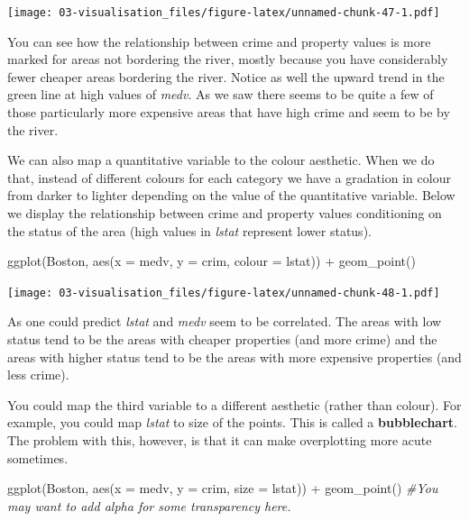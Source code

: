 \documentclass[
]{book}
\newenvironment{Shaded}{\begin{snugshade}}{\end{snugshade}}
\newcommand{\AttributeTok}[1]{\textcolor[rgb]{0.77,0.63,0.00}{#1}}
\newcommand{\CommentTok}[1]{\textcolor[rgb]{0.56,0.35,0.01}{\textit{#1}}}
\newcommand{\FunctionTok}[1]{\textcolor[rgb]{0.00,0.00,0.00}{#1}}
\newcommand{\NormalTok}[1]{#1}
\newcommand{\SpecialCharTok}[1]{\textcolor[rgb]{0.00,0.00,0.00}{#1}}
\begin{document}
\texttt{[image: 03-visualisation\_files/figure-latex/unnamed-chunk-47-1.pdf]}

You can see how the relationship between crime and property values is more marked for areas not bordering the river, mostly because you have considerably fewer cheaper areas bordering the river. Notice as well the upward trend in the green line at high values of \emph{medv}. As we saw there seems to be quite a few of those particularly more expensive areas that have high crime and seem to be by the river.

We can also map a quantitative variable to the colour aesthetic. When we do that, instead of different colours for each category we have a gradation in colour from darker to lighter depending on the value of the quantitative variable. Below we display the relationship between crime and property values conditioning on the status of the area (high values in \emph{lstat} represent lower status).

\begin{Shaded}
\begin{Highlighting}[]
\FunctionTok{ggplot}\NormalTok{(Boston, }\FunctionTok{aes}\NormalTok{(}\AttributeTok{x =}\NormalTok{ medv, }\AttributeTok{y =}\NormalTok{ crim, }\AttributeTok{colour =}\NormalTok{ lstat)) }\SpecialCharTok{+}
  \FunctionTok{geom\_point}\NormalTok{() }
\end{Highlighting}
\end{Shaded}

\texttt{[image: 03-visualisation\_files/figure-latex/unnamed-chunk-48-1.pdf]}

As one could predict \emph{lstat} and \emph{medv} seem to be correlated. The areas with low status tend to be the areas with cheaper properties (and more crime) and the areas with higher status tend to be the areas with more expensive properties (and less crime).

You could map the third variable to a different aesthetic (rather than colour). For example, you could map \emph{lstat} to size of the points. This is called a \textbf{bubblechart}. The problem with this, however, is that it can make overplotting more acute sometimes.

\begin{Shaded}
\begin{Highlighting}[]
\FunctionTok{ggplot}\NormalTok{(Boston, }\FunctionTok{aes}\NormalTok{(}\AttributeTok{x =}\NormalTok{ medv, }\AttributeTok{y =}\NormalTok{ crim, }\AttributeTok{size =}\NormalTok{ lstat)) }\SpecialCharTok{+}
  \FunctionTok{geom\_point}\NormalTok{() }\CommentTok{\#You may want to add alpha for some transparency here.}
\end{Highlighting}
\end{Shaded}
\end{document}
